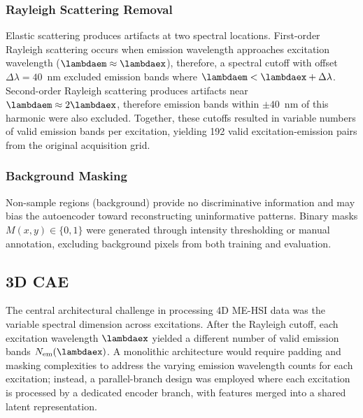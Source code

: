 \subsubsection{Rayleigh Scattering Removal}
Elastic scattering produces artifacts at two spectral locations.
First-order Rayleigh scattering occurs when emission wavelength approaches excitation wavelength ($\lambdaem \approx \lambdaex$), therefore, a spectral cutoff with offset $\Delta\lambda = 40$\, nm excluded emission bands where $\lambdaem < \lambdaex + \Delta\lambda$.
Second-order Rayleigh scattering produces artifacts near $\lambdaem \approx 2\lambdaex$, therefore emission bands within $\pm 40$\, nm of this harmonic were also excluded.
Together, these cutoffs resulted in variable numbers of valid emission bands per excitation, yielding 192 valid excitation-emission pairs from the original acquisition grid.

\subsubsection{Background Masking}
Non-sample regions (background) provide no discriminative information and may bias the autoencoder toward reconstructing uninformative patterns.
Binary masks $M(x, y) \in \{0, 1\}$ were generated through intensity thresholding or manual annotation, excluding background pixels from both training and evaluation.

\subsection{3D CAE}
\label{sec:architecture}

The central architectural challenge in processing 4D ME-HSI data was the variable spectral dimension across excitations.
After the Rayleigh cutoff, each excitation wavelength $\lambdaex$ yielded a different number of valid emission bands $N_{\text{em}}(\lambdaex)$.
A monolithic architecture would require padding and masking complexities to address the varying emission wavelength counts for each excitation; instead, a parallel-branch design was employed where each excitation is processed by a dedicated encoder branch, with features merged into a shared latent representation.

